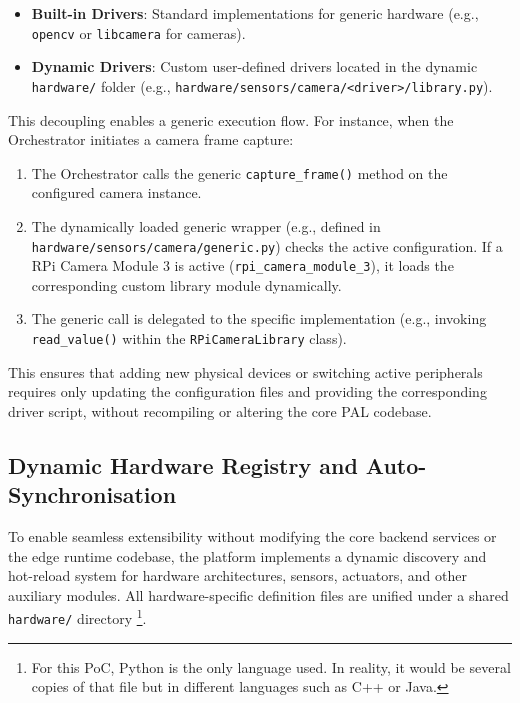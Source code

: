 \begin{itemize}
    \item \textbf{Built-in Drivers}: Standard implementations for generic hardware (e.g., \texttt{opencv} or \texttt{libcamera} for cameras).
    \item \textbf{Dynamic Drivers}: Custom user-defined drivers located in the dynamic \texttt{hardware/} folder (e.g., \texttt{hardware/sensors/camera/<driver>/library.py}).
\end{itemize}

This decoupling enables a generic execution flow. For instance, when the Orchestrator initiates a camera frame capture:

\begin{enumerate}
    \item The Orchestrator calls the generic \texttt{capture\_frame()} method on the configured camera instance.
    \item The dynamically loaded generic wrapper (e.g., defined in \texttt{hardware/sensors/camera/generic.py}) checks the active configuration. If a \gls{RPi} Camera Module 3 is active (\texttt{rpi\_camera\_module\_3}), it loads the corresponding custom library module dynamically.
    \item The generic call is delegated to the specific implementation (e.g., invoking \texttt{read\_value()} within the \texttt{RPiCameraLibrary} class).
\end{enumerate}

This ensures that adding new physical devices or switching active peripherals requires only updating the configuration files and providing the corresponding driver script, without recompiling or altering the core \gls{PAL} codebase.

\subsection{Dynamic Hardware Registry and Auto-Synchronisation}\label{sec:impl:dyn_hardware}

To enable seamless extensibility without modifying the core backend services or the edge runtime codebase, the platform implements a dynamic discovery and hot-reload system for hardware architectures, sensors, actuators, and other auxiliary modules. All hardware-specific definition files are unified under a shared \texttt{hardware/} directory \footnote{For this \gls{PoC}, Python is the only language used. In reality, it would be several copies of that file but in different languages such as C++ or Java.}.

